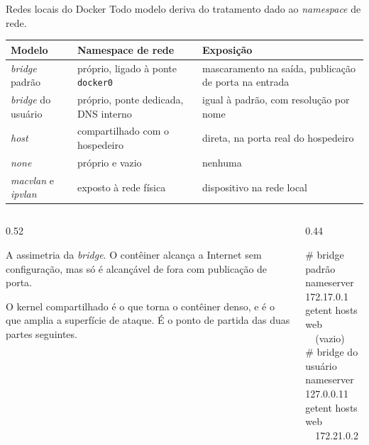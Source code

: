 \documentclass[aspectratio=169]{beamer}
\begin{document}
\begin{frame}{Redes locais do Docker}
  Todo modelo deriva do tratamento dado ao \textit{namespace} de rede.
  \vspace{0.15cm}
  \footnotesize
  \begin{tabularx}{\textwidth}{@{} l X X @{}}
    \toprule
    \textbf{Modelo} & \textbf{Namespace de rede} & \textbf{Exposição} \\
    \midrule
    \textit{bridge} padrão & próprio, ligado à ponte \texttt{docker0} & mascaramento na saída, publicação de porta na entrada \\
    \textit{bridge} do usuário & próprio, ponte dedicada, DNS interno & igual à padrão, com resolução por nome \\
    \textit{host} & compartilhado com o hospedeiro & direta, na porta real do hospedeiro \\
    \textit{none} & próprio e vazio & nenhuma \\
    \textit{macvlan} e \textit{ipvlan} & exposto à rede física & dispositivo na rede local \\
    \bottomrule
  \end{tabularx}
  \vspace{0.25cm}
  \normalsize
  \begin{columns}[T]
    \begin{column}{0.52\textwidth}
      {\footnotesize A assimetria da \textit{bridge}. O contêiner alcança a Internet sem configuração, mas só é alcançável de fora com publicação de porta.
      \vspace{0.15cm}

      O kernel compartilhado é o que torna o contêiner denso, e é o que amplia a superfície de ataque. É o ponto de partida das duas partes seguintes.}
    \end{column}
    \begin{column}{0.44\textwidth}
      \begin{tcolorbox}[colback=black!88, coltext=white, colframe=black, arc=2mm, fontupper=\tiny\ttfamily]
        \# bridge padrão \\
        nameserver 172.17.0.1 \\
        getent hosts web \ \ (vazio) \\[3pt]
        \# bridge do usuário \\
        nameserver 127.0.0.11 \\
        getent hosts web \ \ 172.21.0.2
      \end{tcolorbox}
    \end{column}
  \end{columns}
\end{frame}
\end{document}
